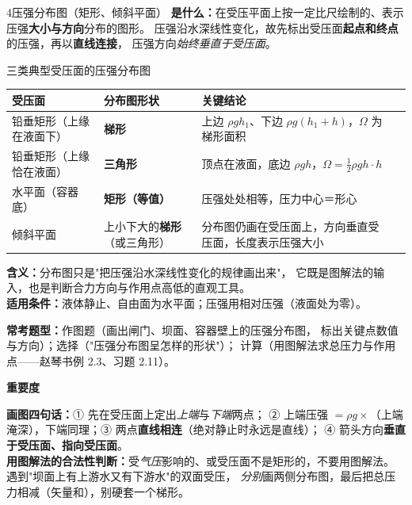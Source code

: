 \begin{kaodian}{4}{压强分布图（矩形、倾斜平面）}
\textbf{是什么：}在受压平面上按一定比尺绘制的、表示压强\textbf{大小与方向}分布的图形。
压强沿水深线性变化，故先标出受压面\textbf{起点和终点}的压强，再以\textbf{直线连接}，
压强方向\emph{始终垂直于受压面}。

\begin{gongshi}{三类典型受压面的压强分布图}
\begin{center}
\begin{tabularx}{\textwidth}{@{}lXXX@{}}
\toprule
受压面 & 分布图形状 & 关键结论 \\
\midrule
铅垂矩形（上缘在液面下） & \textbf{梯形} & 上边 $\rho gh_1$、下边 $\rho g(h_1+h)$，$\Omega$ 为梯形面积 \\[1mm]
铅垂矩形（上缘恰在液面） & \textbf{三角形} & 顶点在液面，底边 $\rho gh$，$\Omega=\frac{1}{2}\rho gh\cdot h$ \\[1mm]
水平面（容器底） & \textbf{矩形（等值）} & 压强处处相等，压力中心＝形心 \\[1mm]
倾斜平面 & 上小下大的\textbf{梯形}（或三角形） & 分布图仍画在受压面上，方向垂直受压面，长度表示压强大小 \\
\bottomrule
\end{tabularx}
\end{center}
\textbf{含义：}分布图只是"把压强沿水深线性变化的规律画出来"，
它既是图解法的输入，也是判断合力方向与作用点高低的直观工具。\\
\textbf{适用条件：}液体静止、自由面为水平面；压强用相对压强（液面处为零）。
\end{gongshi}

\textbf{常考题型：}作图题（画出闸门、坝面、容器壁上的压强分布图，
标出关键点数值与方向）；选择（"压强分布图呈怎样的形状"）；
计算（用图解法求总压力与作用点——赵琴书例 2.3、习题 2.11）。

\textbf{重要度 }\quad{}\quad{}

\begin{banfa}
\textbf{画图四句话：}① 先在受压面上定出\emph{上端}与\emph{下端}两点；
② 上端压强 $=\rho g\times$（上端淹深），下端同理；③ 两点\textbf{直线相连}（绝对静止时永远是直线）；
④ 箭头方向\textbf{垂直于受压面、指向受压面}。\\
\textbf{用图解法的合法性判断：}受\emph{气压}影响的、或受压面不是矩形的，不要用图解法。
遇到"坝面上有上游水又有下游水"的双面受压，
\emph{分别}画两侧分布图，最后把总压力相减（矢量和），别硬套一个梯形。
\end{banfa}
\end{kaodian}

